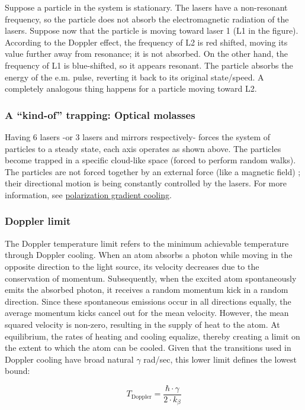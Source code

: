\documentclass[../main.tex]{subfiles}
\begin{document}
\noindent Suppose a particle in the system is stationary. The lasers have a non-resonant frequency, so the particle does not absorb the electromagnetic radiation of the lasers. Suppose now that the particle is moving toward laser 1 (L1 in the figure). According to the Doppler effect, the frequency of L2 is red shifted, moving its value further away from resonance; it is not absorbed. On the other hand, the frequency of L1 is blue-shifted, so it appears resonant. The particle absorbs the energy of the e.m. pulse, reverting it back to its original state/speed. A completely analogous thing happens for a particle moving toward L2. 

\subsubsection{A ``kind-of'' trapping: Optical molasses}
Having 6 lasers -or 3 lasers and mirrors respectively- forces the system of particles to a steady state, each axis operates as shown above. The particles become trapped in a specific cloud-like space (forced to perform random walks). The particles are not forced together by an external force (like a magnetic field) ; their directional motion is being constantly controlled by the lasers. For more information, see \href{https://en.wikipedia.org/wiki/Sisyphus_cooling}{polarization gradient cooling}.

\subsubsection{Doppler limit}
\tab The Doppler temperature limit refers to the minimum achievable temperature through Doppler cooling. When an atom absorbs a photon while moving in the opposite direction to the light source, its velocity decreases due to the conservation of momentum. Subsequently, when the excited atom spontaneously emits the absorbed photon, it receives a random momentum kick in a random direction. Since these spontaneous emissions occur in all directions equally, the average momentum kicks cancel out for the mean velocity. However, the mean squared velocity is non-zero, resulting in the supply of heat to the atom. At equilibrium, the rates of heating and cooling equalize, thereby creating a limit on the extent to which the atom can be cooled. Given that the transitions used in Doppler cooling have broad natural $\gamma$ rad/sec, this lower limit defines the lowest bound:

\begin{equation}
    T_{\text{Doppler}} = \frac{\hbar \cdot \gamma }{2\cdot k_{\beta} }
\end{equation}
\end{document}
